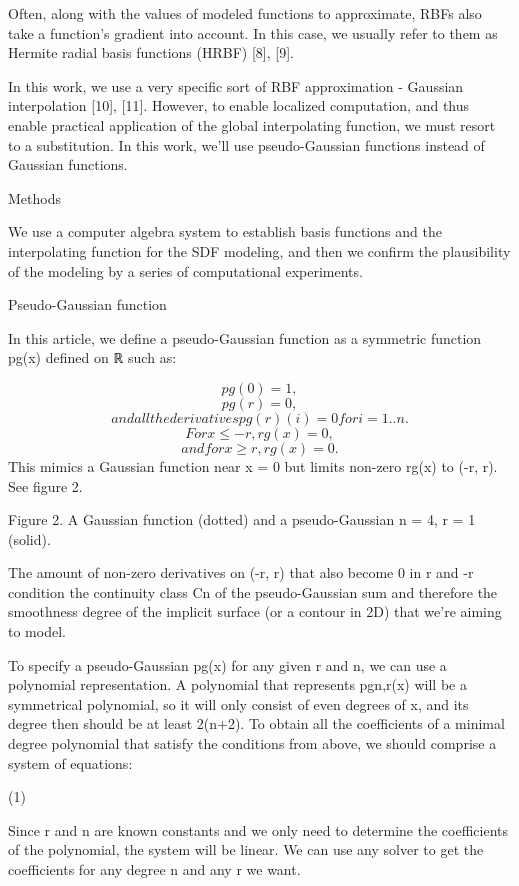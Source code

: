 \documentclass[12pt,a4paper]{article}
\begin{document}
\par
Often, along with the values of modeled functions to approximate, RBFs also take a function’s gradient into account. In this case, we usually refer to them as Hermite radial basis functions (HRBF) [8], [9].
\par
In this work, we use a very specific sort of RBF approximation - Gaussian interpolation [10], [11]. However, to enable localized computation, and thus enable practical application of the global interpolating function, we must resort to a substitution. In this work, we’ll use pseudo-Gaussian functions instead of Gaussian functions.
\par
Methods
\par
We use a computer algebra system to establish basis functions and the interpolating function for the SDF modeling, and then we confirm the plausibility of the modeling by a series of computational experiments.
\par
Pseudo-Gaussian function
\par
In this article, we define a pseudo-Gaussian function as a symmetric function pg(x) defined on ℝ such as:
\par
\[pg(0) = 1,\]
\[pg(r) = 0,\]
\[and all the derivatives pg(r)(i)=0 for i = 1..n.\]
\[For x \leq -r, rg(x) = 0,\]
\[and for x \geq r, rg(x) = 0.\]
This mimics a Gaussian function near x = 0 but limits non-zero rg(x) to (-r, r). See figure 2.
\par
Figure 2. A Gaussian function (dotted) and a pseudo-Gaussian n = 4, r = 1 (solid).
\par
The amount of non-zero derivatives on (-r, r) that also become 0 in r and -r condition the continuity class Cn of the pseudo-Gaussian sum and therefore the smoothness degree of the implicit surface (or a contour in 2D) that we’re aiming to model.
\par
To specify a pseudo-Gaussian pg(x) for any given r and n, we can use a polynomial representation. A polynomial that represents pgn,r(x) will be a symmetrical polynomial, so it will only consist of even degrees of x, and its degree then should be at least 2(n+2). To obtain all the coefficients of a minimal degree polynomial that satisfy the conditions from above, we should comprise a system of equations:
\par
(1)
\par
Since r and n are known constants and we only need to determine the coefficients of the polynomial, the system will be linear. We can use any solver to get the coefficients for any degree n and any r we want.
\end{document}
